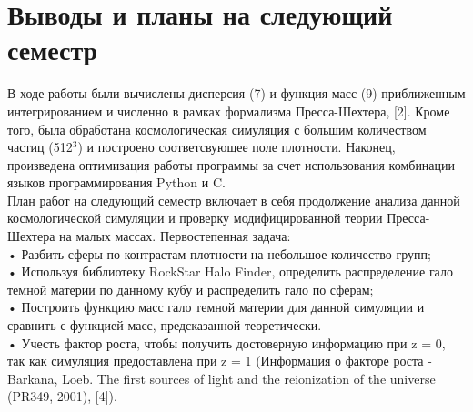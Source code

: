 \documentclass[11pt]{article}
\begin{document}
\section{Выводы и планы на следующий семестр}
В ходе работы были вычислены дисперсия (7) и функция масс (9) приближенным интегрированием и численно в рамках формализма Пресса-Шехтера, [2]. Кроме того, была обработана космологическая симуляция с большим количеством частиц (512$^3$) и построено соответсвующее поле плотности. Наконец, произведена оптимизация работы программы за счет использования комбинации языков программирования Python и C.\\
План работ на следующий семестр включает в себя продолжение анализа данной космологической симуляции и проверку модифицированной теории Пресса-Шехтера на малых массах. Первостепенная задача:\\
•	Разбить сферы по контрастам плотности на небольшое количество групп;\\
•	Используя библиотеку RockStar Halo Finder, определить распределение гало темной материи по данному кубу и распределить гало по сферам;\\
•	Построить функцию масс гало темной материи для данной симуляции и сравнить с функцией масс, предсказанной теоретически.\\
•	Учесть фактор роста, чтобы получить достоверную информацию при z = 0, так как симуляция предоставлена при z = 1 (Информация о факторе роста - Barkana, Loeb. The first sources of light and the reionization of the universe (PR349, 2001), [4]).
\end{document}
